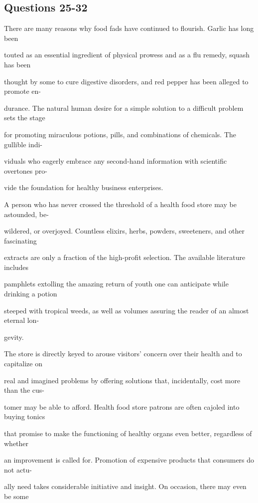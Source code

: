 \documentclass[12pt]{article}
\begin{document}
\subsection*{Questions 25-32}
\begingroup
\small
\sloppy
\setlength{\parskip}{0pt}
\setlength{\parindent}{0pt}
There are many reasons why food fads have continued to flourish. Garlic has long been\par
touted as an essential ingredient of physical prowess and as a flu remedy, squash has been\par
thought by some to cure digestive disorders, and red pepper has been alleged to promote en-\par
durance. The natural human desire for a simple solution to a difficult problem sets the stage\par
for promoting miraculous potions, pills, and combinations of chemicals. The gullible indi-\par
viduals who eagerly embrace any second-hand information with scientific overtones pro-\par
vide the foundation for healthy business enterprises.\par
A person who has never crossed the threshold of a health food store may be astounded, be-\par
wildered, or overjoyed. Countless elixirs, herbs, powders, sweeteners, and other fascinating\par
extracts are only a fraction of the high-profit selection. The available literature includes\par
pamphlets extolling the amazing return of youth one can anticipate while drinking a potion\par
steeped with tropical weeds, as well as volumes assuring the reader of an almost eternal lon-\par
gevity.\par
The store is directly keyed to arouse visitors' concern over their health and to capitalize on\par
real and imagined problems by offering solutions that, incidentally, cost more than the cus-\par
tomer may be able to afford. Health food store patrons are often cajoled into buying tonics\par
that promise to make the functioning of healthy organs even better, regardless of whether\par
an improvement is called for. Promotion of expensive products that consumers do not actu-\par
ally need takes considerable initiative and insight. On occasion, there may even be some\par
\end{document}

